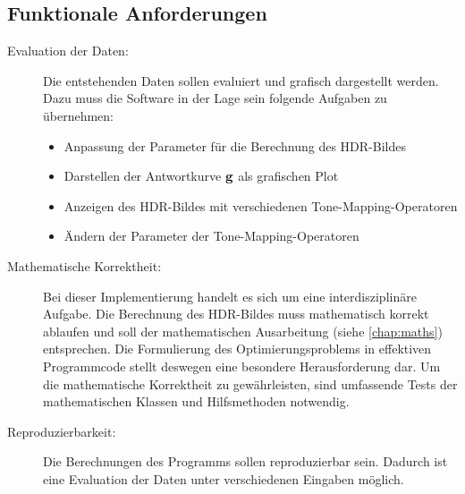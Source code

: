 \subsection{Funktionale Anforderungen}
\label{fa}
\begin{description}
\item[Evaluation der Daten:] Die entstehenden Daten sollen evaluiert und grafisch dargestellt werden. Dazu muss die Software in der Lage sein folgende Aufgaben zu übernehmen: 
    \begin{itemize}
        \item Anpassung der Parameter für die Berechnung des \gls{HDR}-Bildes
        \item Darstellen der Antwortkurve $\mathbf g$ als grafischen Plot
        \item Anzeigen des \gls{HDR}-Bildes mit verschiedenen \gls{Tone-Mapping}-Operatoren
        \item Ändern der Parameter der \gls{Tone-Mapping}-Operatoren
    \end{itemize}
    
\item[Mathematische Korrektheit:] Bei dieser Implementierung handelt es sich um eine interdisziplinäre Aufgabe. Die Berechnung des \gls{HDR}-Bildes muss mathematisch korrekt ablaufen und soll der mathematischen Ausarbeitung (siehe \autoref{chap:maths}) entsprechen. Die Formulierung des Optimierungsproblems in effektiven Programmcode stellt deswegen eine besondere Herausforderung dar. Um die mathematische Korrektheit zu gewährleisten, sind umfassende Tests der mathematischen Klassen und Hilfsmethoden notwendig.

\item[Reproduzierbarkeit:] Die Berechnungen des Programms sollen reproduzierbar sein. Dadurch ist eine Evaluation der Daten unter verschiedenen Eingaben möglich.

\end{description}


